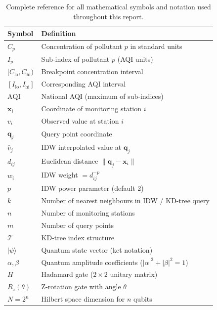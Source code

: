 \documentclass[12pt,a4paper]{article}
\newcommand{\ket}[1]{|#1\rangle}
\begin{document}
\begin{table}[H]
\centering
\caption[Symbol and notation reference]{%
Complete reference for all mathematical symbols and notation used
throughout this report.}
\label{tab:notation}
\begin{tabularx}{\textwidth}{@{}lX@{}}
\toprule
\textbf{Symbol} & \textbf{Definition} \\
\midrule
$C_p$                    & Concentration of pollutant $p$ in standard units \\
$I_p$                    & Sub-index of pollutant $p$ (AQI units) \\
$[C_{\text{lo}}, C_{\text{hi}})$ & Breakpoint concentration interval \\
$[I_{\text{lo}}, I_{\text{hi}}]$ & Corresponding AQI interval \\
$\text{AQI}$             & National AQI (maximum of sub-indices) \\
$\mathbf{x}_i$           & Coordinate of monitoring station $i$ \\
$v_i$                    & Observed value at station $i$ \\
$\mathbf{q}_j$           & Query point coordinate \\
$\hat{v}_j$              & IDW interpolated value at $\mathbf{q}_j$ \\
$d_{ij}$                 & Euclidean distance $\|\mathbf{q}_j - \mathbf{x}_i\|$ \\
$w_i$                    & IDW weight $= d_{ij}^{-p}$ \\
$p$                      & IDW power parameter (default 2) \\
$k$                      & Number of nearest neighbours in IDW / KD-tree query \\
$n$                      & Number of monitoring stations \\
$m$                      & Number of query points \\
$\mathcal{T}$            & KD-tree index structure \\
$\ket{\psi}$             & Quantum state vector (ket notation) \\
$\alpha, \beta$          & Quantum amplitude coefficients ($|\alpha|^2 + |\beta|^2 = 1$) \\
$H$                      & Hadamard gate ($2\times2$ unitary matrix) \\
$R_z(\theta)$            & Z-rotation gate with angle $\theta$ \\
$N = 2^n$                & Hilbert space dimension for $n$ qubits \\

\end{tabularx}
\end{table}
\end{document}
